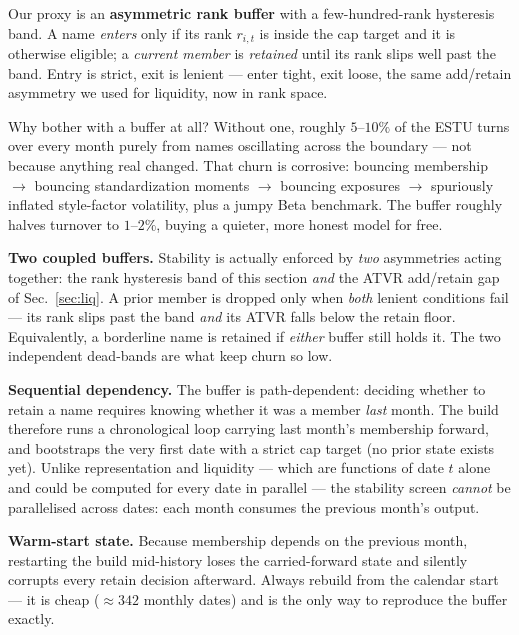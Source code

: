\documentclass[11pt]{article}
\theoremstyle{definition}
\theoremstyle{plain}
\theoremstyle{remark}
\begin{document}
Our proxy is an \textbf{asymmetric rank buffer} with a few-hundred-rank hysteresis band. A name \emph{enters} only if its rank $r_{i,t}$ is inside the cap target and it is otherwise eligible; a \emph{current member} is \emph{retained} until its rank slips well past the band. Entry is strict, exit is lenient --- enter tight, exit loose, the same add/retain asymmetry we used for liquidity, now in rank space.

\begin{intuition}
Why bother with a buffer at all? Without one, roughly $5$--$10\%$ of the ESTU turns over every month purely from names oscillating across the boundary --- not because anything real changed. That churn is corrosive: bouncing membership $\to$ bouncing standardization moments $\to$ bouncing exposures $\to$ spuriously inflated style-factor volatility, plus a jumpy Beta benchmark. The buffer roughly halves turnover to $1$--$2\%$, buying a quieter, more honest model for free.
\end{intuition}

\textbf{Two coupled buffers.} Stability is actually enforced by \emph{two} asymmetries acting together: the rank hysteresis band of this section \emph{and} the ATVR add/retain gap of Sec.\ \ref{sec:liq}. A prior member is dropped only when \emph{both} lenient conditions fail --- its rank slips past the band \emph{and} its ATVR falls below the retain floor. Equivalently, a borderline name is retained if \emph{either} buffer still holds it. The two independent dead-bands are what keep churn so low.

\textbf{Sequential dependency.} The buffer is path-dependent: deciding whether to retain a name requires knowing whether it was a member \emph{last} month. The build therefore runs a chronological loop carrying last month's membership forward, and bootstraps the very first date with a strict cap target (no prior state exists yet). Unlike representation and liquidity --- which are functions of date $t$ alone and could be computed for every date in parallel --- the stability screen \emph{cannot} be parallelised across dates: each month consumes the previous month's output.

\begin{pitfall}
\textbf{Warm-start state.} Because membership depends on the previous month, restarting the build mid-history loses the carried-forward state and silently corrupts every retain decision afterward. Always rebuild from the calendar start --- it is cheap ($\approx 342$ monthly dates) and is the only way to reproduce the buffer exactly.
\end{pitfall}
\end{document}
